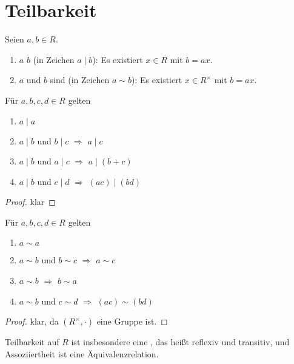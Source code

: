 \section{Teilbarkeit}

\begin{definition}[Teilbarkeit]
	Seien $a,b\in R$.
	\begin{enumerate}
		\item $a$  $b$ (in Zeichen $a\mid b$): Es existiert $x\in R$ mit $b=ax$.
		\item $a$ und $b$ sind  (in Zeichen $a\sim b$): Es existiert $x\in R^{\times}$ mit $b=ax$.
	\end{enumerate}
\end{definition}

\begin{lemma}
	Für $a,b,c,d\in R$ gelten
	\begin{enumerate}
		\item $a\mid a$
		\item $a\mid b$ und $b\mid c$ $\Rightarrow$ $a\mid c$
		\item $a\mid b$ und $a\mid c$ $\Rightarrow$ $a\mid (b+c)$
		\item $a\mid b$ und $c\mid d$ $\Rightarrow$ $(ac)\mid (bd)$
	\end{enumerate}
\end{lemma}
\begin{proof}
	klar
\end{proof}

\begin{lemma}
	Für $a,b,c,d\in R$ gelten
	\begin{enumerate}
		\item $a\sim a$
		\item $a\sim b$ und $b\sim c$ $\Rightarrow$ $a\sim c$
		\item $a\sim b$ $\Rightarrow$ $b\sim a$
		\item $a\sim b$ und $c\sim d$ $\Rightarrow$ $(ac)\sim (bd)$
	\end{enumerate}
\end{lemma}
\begin{proof}
	klar, da $(R^\times,\cdot)$ eine Gruppe ist.
\end{proof}

\begin{remark}
	Teilbarkeit auf $R$ ist insbesondere eine , das heißt reflexiv und transitiv, und Assoziiertheit ist eine Äquivalenzrelation.
\end{remark}

